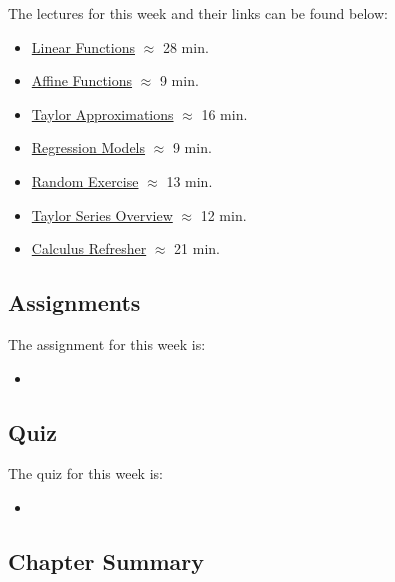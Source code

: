 The lectures for this week and their links can be found below:

\begin{itemize}
    \item \href{https://applied.cs.colorado.edu/mod/hvp/view.php?id=50678}{Linear Functions} $\approx$ 28 min.
    \item \href{https://applied.cs.colorado.edu/mod/hvp/view.php?id=50679}{Affine Functions} $\approx$ 9 min.
    \item \href{https://applied.cs.colorado.edu/mod/hvp/view.php?id=50680}{Taylor Approximations} $\approx$ 16 min.
    \item \href{https://applied.cs.colorado.edu/mod/hvp/view.php?id=50681}{Regression Models} $\approx$ 9 min.
    \item \href{https://applied.cs.colorado.edu/mod/hvp/view.php?id=50682}{Random Exercise} $\approx$ 13 min.
    \item \href{https://www.youtube.com/watch?v=eX1hvWxmJVE}{Taylor Series Overview} $\approx$ 12 min.
    \item \href{https://applied.cs.colorado.edu/mod/hvp/view.php?id=50684}{Calculus Refresher} $\approx$ 21 min.
\end{itemize}

\subsection{Assignments}

The assignment for this week is:

\begin{itemize}
    \item {}
\end{itemize}

\subsection{Quiz}

The quiz for this week is:

\begin{itemize}
    \item {}
\end{itemize}

\subsection{Chapter Summary}

